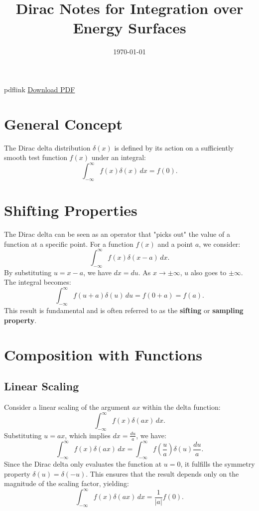 \documentclass[11pt]{article}
\title{Dirac Notes for Integration over Energy Surfaces}
\author{}
\date{\today}
\begin{document}
\maketitle
\begin{warpHTML}
\begin{BlockClass}{pdflink}
\href{dirac.pdf}{Download PDF}
\end{BlockClass}
\end{warpHTML}
\tableofcontents

\section{General Concept}
The Dirac delta distribution $\delta(x)$ is defined by its action on a sufficiently smooth test function $f(x)$ under an integral:
\[
\int_{-\infty}^{\infty} f(x) \delta(x) \, dx = f(0).
\]

\section{Shifting Properties}
The Dirac delta can be seen as an operator that "picks out" the value of a function at a specific point. For a function \( f(x) \) and a point \( a \), we consider:
\[
\int_{-\infty}^{\infty} f(x) \delta(x - a) \, dx.
\]
By substituting \( u = x - a \), we have \( dx = du \). As \( x \to \pm\infty \), \( u \) also goes to \( \pm\infty \). The integral becomes:
\[
\int_{-\infty}^{\infty} f(u + a) \delta(u) \, du = f(0 + a) = f(a).
\]
This result is fundamental and is often referred to as the \textbf{sifting} or \textbf{sampling property}.

\section{Composition with Functions}
\subsection{Linear Scaling}
Consider a linear scaling of the argument $ax$ within the delta function:
\[
\int_{-\infty}^{\infty} f(x) \delta(ax) \, dx.
\]
Substituting \( u = a x \), which implies \( dx = \frac{du}{a} \), we have:
\[
\int_{-\infty}^{\infty} f(x) \delta(a x) \, dx = \int_{-\infty}^{\infty} f\left(\frac{u}{a}\right) \delta(u) \frac{du}{a}.
\]
Since the Dirac delta only evaluates the function at \( u = 0 \), it fulfills the symmetry property \( \delta(u) = \delta(-u) \). This ensures that the result depends only on the magnitude of the scaling factor, yielding:
\[
\int_{-\infty}^{\infty} f(x) \delta(a x) \, dx = \frac{1}{|a|} f(0).
\]
\end{document}
